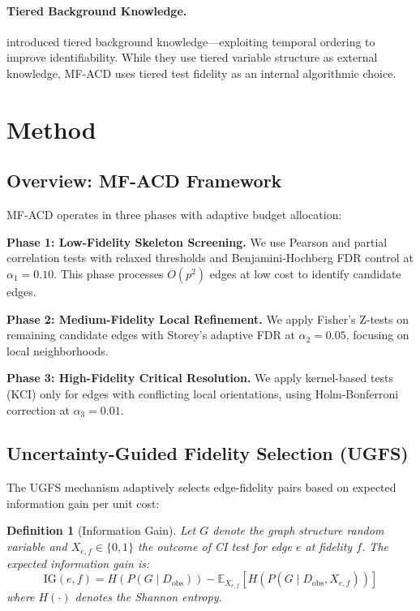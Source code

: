\documentclass{article}
\newtheorem{definition}{Definition}
\begin{document}
\paragraph{Tiered Background Knowledge.} \citet{bang2023wise, bang2025constraint} introduced tiered background knowledge---exploiting temporal ordering to improve identifiability. While they use tiered variable structure as external knowledge, MF-ACD uses tiered test fidelity as an internal algorithmic choice.

\section{Method}

\subsection{Overview: MF-ACD Framework}

MF-ACD operates in three phases with adaptive budget allocation:

\textbf{Phase 1: Low-Fidelity Skeleton Screening.} We use Pearson and partial correlation tests with relaxed thresholds and Benjamini-Hochberg FDR control at $\alpha_1 = 0.10$. This phase processes $O(p^2)$ edges at low cost to identify candidate edges.

\textbf{Phase 2: Medium-Fidelity Local Refinement.} We apply Fisher's Z-tests on remaining candidate edges with Storey's adaptive FDR at $\alpha_2 = 0.05$, focusing on local neighborhoods.

\textbf{Phase 3: High-Fidelity Critical Resolution.} We apply kernel-based tests (KCI) only for edges with conflicting local orientations, using Holm-Bonferroni correction at $\alpha_3 = 0.01$.

\subsection{Uncertainty-Guided Fidelity Selection (UGFS)}

The UGFS mechanism adaptively selects edge-fidelity pairs based on expected information gain per unit cost:

\begin{definition}[Information Gain]
Let $G$ denote the graph structure random variable and $X_{e,f} \in \{0, 1\}$ the outcome of CI test for edge $e$ at fidelity $f$. The expected information gain is:
\begin{equation}
\text{IG}(e, f) = H(P(G \mid D_{\text{obs}})) - \mathbb{E}_{X_{e,f}}[H(P(G \mid D_{\text{obs}}, X_{e,f}))]
\end{equation}
where $H(\cdot)$ denotes the Shannon entropy.
\end{definition}
\end{document}
